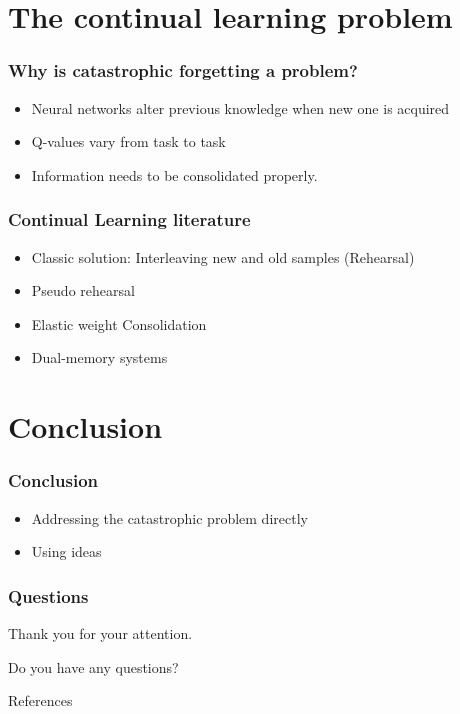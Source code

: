 \documentclass{beamer}
\theoremstyle{remark}
\theoremstyle{plain}
\begin{document}
\section{The continual learning problem}
\label{sec:continual}

\begin{frame}
 \frametitle{Why is catastrophic forgetting a problem?}
  \begin{itemize}
      \item Neural networks alter previous knowledge when new one is acquired
      \item Q-values vary from task to task
      \item Information needs to be consolidated properly.
  \end{itemize}
\end{frame}


\begin{frame}
 \frametitle{Continual Learning literature}
\begin{itemize}
    \item Classic solution: Interleaving new and old samples (Rehearsal)
    \item Pseudo rehearsal \cite{RobinsConsolidationBrain}
    \item Elastic weight Consolidation \cite{Kirkpatrick2017OvercomingNetworks.}
    \item Dual-memory systems
\end{itemize}
  
\end{frame}


\section{Conclusion}
\label{sec:continual}
\begin{frame}
\frametitle{Conclusion}
\begin{itemize}
    \item Addressing the catastrophic problem directly
    \item Using ideas 
\end{itemize}
\end{frame}



\begin{frame}
  \frametitle{Questions}
  \begin{center}
    Thank you for your attention.

    Do you have any questions?
  \end{center}
\end{frame}

\setcounter{lastframe}{\insertframenumber}

\begin{frame}[allowframebreaks]{References}


\end{frame}

\setcounter{framenumber}{\thelastframe}
\end{document}
